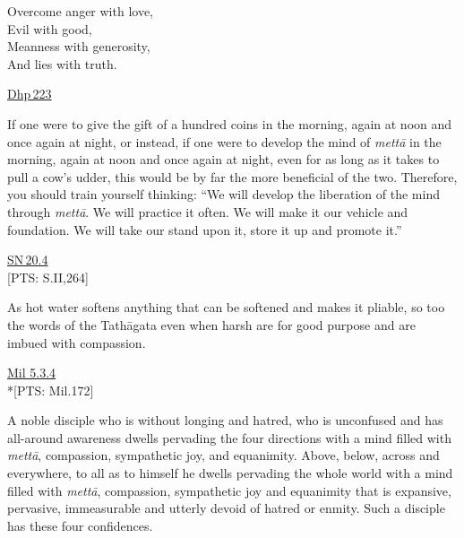 \documentclass[10pt, openright]{book}
\begin{document}
\begin{itemize}


Overcome anger with love, \\ 
Evil with good, \\ 
Meanness with generosity, \\ 
And lies with truth.


\end{itemize}
\begin{flushright}
\href{https://suttacentral.net/dhp223/en/sujato}{Dhp 223}


\end{flushright}
If one were to give the gift of a hundred coins in the morning, again at noon and once again at night, or instead, if one were to develop the mind of \textit{mettā} in the morning, again at noon and once again at night, even for as long as it takes to pull a cow’s udder, this would be by far the more beneficial of the two. Therefore, you should train yourself thinking: “We will develop the liberation of the mind through \textit{mettā}. We will practice it often. We will make it our vehicle and foundation. We will take our stand upon it, store it up and promote it.”


\begin{flushright}
\href{https://suttacentral.net/sn20.4/en/sujato}{SN 20.4}\\

[PTS: S.II,264]


\end{flushright}
As hot water softens anything that can be softened and makes it pliable, so too the words of the Tathāgata even when harsh are for good purpose and are imbued with compassion.


\begin{flushright}
\href{https://suttacentral.net/mil5.3.4/en/tw_rhysdavids?reference=main/pts#pts-vp-pli172}{Mil 5.3.4}\\

*[PTS: Mil.172]


\end{flushright}
A noble disciple who is without longing and hatred, who is unconfused and has all-around awareness dwells pervading the four directions with a mind filled with \textit{mettā}, compassion, sympathetic joy, and equanimity. Above, below, across and everywhere, to all as to himself he dwells pervading the whole world with a mind filled with \textit{mettā}, compassion, sympathetic joy and equanimity that is expansive, pervasive, immeasurable and utterly devoid of hatred or enmity. Such a disciple has these four confidences.
\end{document}
